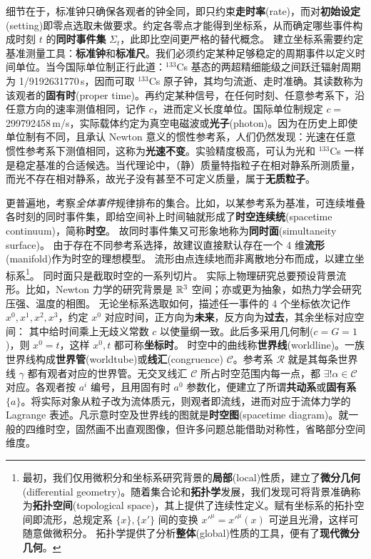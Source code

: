细节在于，标准钟只确保各观者的钟全同，即只约束\textbf{走时率}(rate)，而对\textbf{初始设定}(setting)即零点选取未做要求。约定各零点才能得到坐标系，从而确定哪些事件构成时刻 $t$ 的\textbf{同时事件集} $\Sigma_t$，此即比空间更严格的替代概念。
建立坐标系需要约定基准测量工具：\textbf{标准钟}和\textbf{标准尺}。我们必须约定某种足够稳定的周期事件以定义时间单位。当今国际单位制正行此道：$^{133}$Cs 基态的两超精细能级之间跃迁辐射周期为 1/9192631770\,s，因而可取 $^{133}$Cs 原子钟，其均匀流逝、走时准确。其读数称为该观者的\textbf{固有时}(proper time)。再约定某种信号，在任何时刻、任意参考系下，沿任意方向的速率测值相同，记作 $c$，进而定义长度单位。国际单位制规定 $c=$ 299792458\,m/s，实际载体约定为真空电磁波或\textbf{光子}(photon)。因为在历史上即使单位制有不同，且承认 Newton 意义的惯性参考系，人们仍然发现：光速在任意惯性参考系下测值相同，这称为\textbf{光速不变}。实验精度极高，可认为光和 $^{133}$Cs 一样是稳定基准的合适候选。当代理论中，（静）质量特指粒子在相对静系所测质量，而光不存在相对静系，故光子没有甚至不可定义质量，属于\textbf{无质粒子}。

更普遍地，考察\textit{全体事件}规律排布的集合。比如，以某参考系为基准，可连续堆叠各时刻的同时事件集，即给空间补上时间轴就形成了\textbf{时空连续统}(spacetime continuum)，简称\textbf{时空}。
故同时事件集又可形象地称为\textbf{同时面}(simultaneity surface)。
由于存在不同参考系选择，故建议直接默认存在一个 4 维\textbf{流形}(manifold)作为时空的理想模型。
流形由点连续地而非离散地分布而成，以建立坐标系\footnote{最初，我们仅用微积分和坐标系研究背景的\textbf{局部}(local)性质，建立了\textbf{微分几何}(differential geometry)。随着集合论和\textbf{拓扑学}发展，我们发现可将背景准确称为\textbf{拓扑空间}(topological space)，其上提供了连续性定义。赋有坐标系的拓扑空间即流形，总规定系 $\{x\},\{x'\}$ 间的变换 $x'^\mu=x'^\mu(x)$ 可逆且光滑，这样可随意做微积分。
拓扑学提供了分析\textbf{整体}(global)性质的工具，便有了\textbf{现代微分几何}。}。
同时面只是截取时空的一系列切片。
实际上物理研究总要预设背景流形。比如，Newton 力学的研究背景是 $\mathbb{R}^3$ 空间；亦或更为抽象，如热力学会研究压强、温度的相图。
无论坐标系选取如何，描述任一事件的 4 个坐标依次记作 $x^0,x^1,x^2,x^3$，约定 $x^0$ 对应时间，正方向为\textbf{未来}，反方向为\textbf{过去}，其余坐标对应空间：
其中给时间乘上无歧义常数 $c$ 以使量纲一致。此后多采用几何制($c=G=1$)，则 $x^0=t$，这样 $x^0,t$ 都可称\textbf{坐标时}。
时空中的曲线称\textbf{世界线}(worldline)。一族世界线构成\textbf{世界管}(worldtube)或\textbf{线汇}(congruence) $\mathscr C$。参考系 $\mathscr R$ 就是其每条世界线 $\gamma$ 都有观者对应的世界管。无交叉线汇 $\mathscr C$ 所占时空范围内每一点，都 $\exists! \alpha\in\mathscr C$ 对应。各观者按 $a^i$ 编号，且用固有时 $a^0$ 参数化，便建立了所谓\textbf{共动系}或\textbf{固有系} $\{a\}$。将实际对象从粒子改为流体质元，则观者即流线，进而对应于流体力学的 Lagrange 表述。凡示意时空及世界线的图就是\textbf{时空图}(spacetime diagram)。就一般的四维时空，固然画不出直观图像，但许多问题总能借助对称性，省略部分空间维度。

